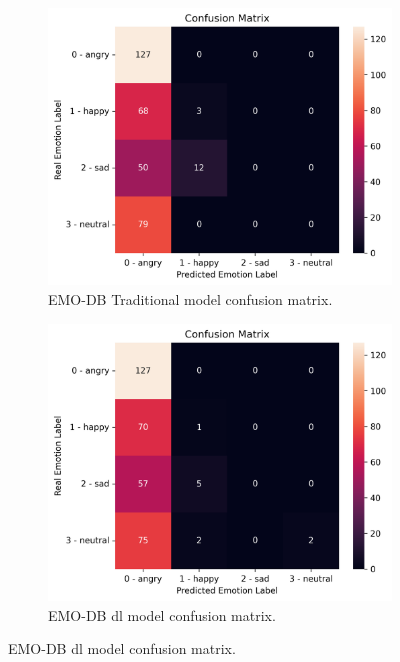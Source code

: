 \begin{figure}[H]
	\newline
	\begin{subfigure}{.5\textwidth}
		\centering
		\includegraphics[width=\linewidth]{figs/4_5_discussion/emo_trad_cm.png}
		\caption{EMO-DB Traditional model confusion matrix.}
	\end{subfigure}%
	\begin{subfigure}{.5\textwidth}
		\centering
		\includegraphics[width=\linewidth]{figs/4_5_discussion/emo_deep_cm.png}
		\caption{EMO-DB \ac{dl} model confusion matrix.}
	\end{subfigure}
	\newline

\end{figure}
